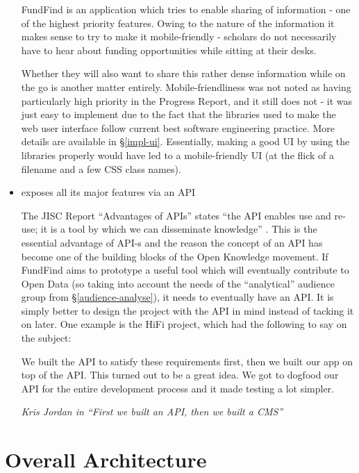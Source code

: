 \begin{itemize}
 FundFind is an application which tries to enable sharing of information - one of the highest priority features. Owing to the nature of the information it makes sense to try to make it mobile-friendly - scholars do not necessarily have to hear about funding opportunities while sitting at their desks.
 
 Whether they will also want to share this rather dense information while on the go is another matter entirely. Mobile-friendliness was not noted as having particularly high priority in the Progress Report, and it still does not - it was just easy to implement due to the fact that the libraries used to make the web user interface follow current best software engineering practice. More details are available in \S\ref{impl-ui}. Essentially, making a good UI by using the libraries properly would have led to a mobile-friendly UI (at the flick of a filename and a few CSS class names).
 
 \item exposes all its major features via an API
 
 The JISC Report ``Advantages of APIs'' states ``the API enables use and re-use; it is a tool by which we can disseminate knowledge'' \cite{advantages-apis}. This is the essential advantage of API-s and the reason the concept of an API has become one of the building blocks of the Open Knowledge movement. If FundFind aims to prototype a useful tool which will eventually contribute to Open Data (so taking into account the needs of the ``analytical'' audience group from \S\ref{audience-analyse}), it needs to eventually have an API. It is simply better to design the project with the API in mind instead of tacking it on later. One example is the HiFi project, which had the following to say on the subject:
 
 \begin{shadequote}
  We built the API to satisfy these requirements first, then we built our app on top of the API. This turned out to be a great idea. We got to dogfood our API for the entire development process and it made testing a lot simpler.
  \par\emph{Kris Jordan in ``First we built an API, then we built a CMS'' \cite{hifi-api}}
 \end{shadequote}
 
\end{itemize}

\section{Overall Architecture}

